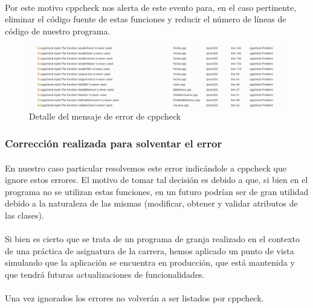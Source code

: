 			\paragraph{}Por este motivo cppcheck nos alerta de este evento para, en el caso pertinente, eliminar el código fuente de estas funciones y reducir el número de líneas de código de nuestro programa.
		
			\begin{figure}[H]
				\centering
				\includegraphics[scale=0.38]{img/captura62.png}
				\caption{Detalle del mensaje de error de cppcheck}
				\label{captura62}
			\end{figure}
		
		\subsubsection{Corrección realizada para solventar el error}
		
			\paragraph{}En nuestro caso particular resolvemos este error indicándole a cppcheck que ignore estos errores. El motivo de tomar tal decisión es debido a que, si bien en el programa no se utilizan estas funciones, en un futuro podrían ser de gran utilidad debido a la naturaleza de las mismas (modificar, obtener y validar atributos de las clases).
			
			\paragraph{}Si bien es cierto que se trata de un programa de granja realizado en el contexto de una práctica de asignatura de la carrera, hemos aplicado un punto de vista simulando que la aplicación se encuentra en producción, que está mantenida y que tendrá futuras actualizaciones de funcionalidades.
			
			\paragraph{}Una vez ignorados los errores no volverán a ser listados por cppcheck.
			
